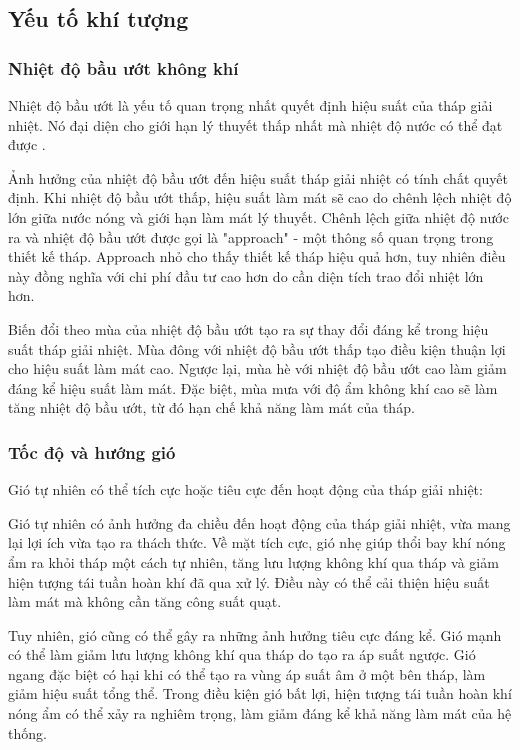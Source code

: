 \documentclass[../main.tex]{subfiles}
\begin{document}
\subsection{Yếu tố khí tượng}
\label{sec:meteorological_factors}

\subsubsection{Nhiệt độ bầu ướt không khí}
Nhiệt độ bầu ướt là yếu tố quan trọng nhất quyết định hiệu suất của tháp giải nhiệt. Nó đại diện cho giới hạn lý thuyết thấp nhất mà nhiệt độ nước có thể đạt được \cite{ashrae2020cooling}.

Ảnh hưởng của nhiệt độ bầu ướt đến hiệu suất tháp giải nhiệt có tính chất quyết định. Khi nhiệt độ bầu ướt thấp, hiệu suất làm mát sẽ cao do chênh lệch nhiệt độ lớn giữa nước nóng và giới hạn làm mát lý thuyết. Chênh lệch giữa nhiệt độ nước ra và nhiệt độ bầu ướt được gọi là "approach" - một thông số quan trọng trong thiết kế tháp. Approach nhỏ cho thấy thiết kế tháp hiệu quả hơn, tuy nhiên điều này đồng nghĩa với chi phí đầu tư cao hơn do cần diện tích trao đổi nhiệt lớn hơn.

Biến đổi theo mùa của nhiệt độ bầu ướt tạo ra sự thay đổi đáng kể trong hiệu suất tháp giải nhiệt. Mùa đông với nhiệt độ bầu ướt thấp tạo điều kiện thuận lợi cho hiệu suất làm mát cao. Ngược lại, mùa hè với nhiệt độ bầu ướt cao làm giảm đáng kể hiệu suất làm mát. Đặc biệt, mùa mưa với độ ẩm không khí cao sẽ làm tăng nhiệt độ bầu ướt, từ đó hạn chế khả năng làm mát của tháp.

\subsubsection{Tốc độ và hướng gió}
Gió tự nhiên có thể tích cực hoặc tiêu cực đến hoạt động của tháp giải nhiệt:

Gió tự nhiên có ảnh hưởng đa chiều đến hoạt động của tháp giải nhiệt, vừa mang lại lợi ích vừa tạo ra thách thức. Về mặt tích cực, gió nhẹ giúp thổi bay khí nóng ẩm ra khỏi tháp một cách tự nhiên, tăng lưu lượng không khí qua tháp và giảm hiện tượng tái tuần hoàn khí đã qua xử lý. Điều này có thể cải thiện hiệu suất làm mát mà không cần tăng công suất quạt.

Tuy nhiên, gió cũng có thể gây ra những ảnh hưởng tiêu cực đáng kể. Gió mạnh có thể làm giảm lưu lượng không khí qua tháp do tạo ra áp suất ngược. Gió ngang đặc biệt có hại khi có thể tạo ra vùng áp suất âm ở một bên tháp, làm giảm hiệu suất tổng thể. Trong điều kiện gió bất lợi, hiện tượng tái tuần hoàn khí nóng ẩm có thể xảy ra nghiêm trọng, làm giảm đáng kể khả năng làm mát của hệ thống.
\end{document}
